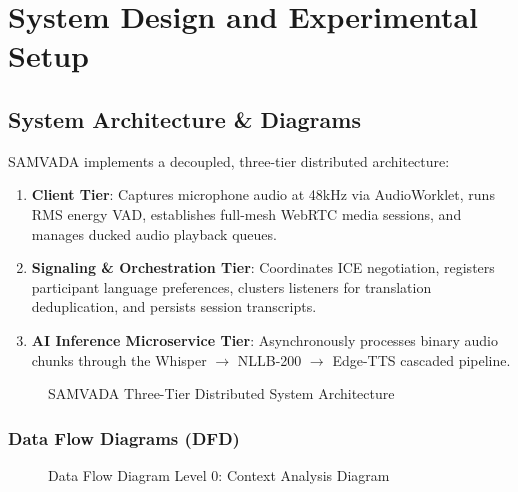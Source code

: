\documentclass[12pt,a4paper]{report}
\begin{document}
\chapter{System Design and Experimental Setup}

\section{System Architecture \& Diagrams}
SAMVADA implements a decoupled, three-tier distributed architecture:
\begin{enumerate}
    \item \textbf{Client Tier}: Captures microphone audio at 48kHz via AudioWorklet, runs RMS energy VAD, establishes full-mesh WebRTC media sessions, and manages ducked audio playback queues.
    \item \textbf{Signaling \& Orchestration Tier}: Coordinates ICE negotiation, registers participant language preferences, clusters listeners for translation deduplication, and persists session transcripts.
    \item \textbf{AI Inference Microservice Tier}: Asynchronously processes binary audio chunks through the Whisper $\rightarrow$ NLLB-200 $\rightarrow$ Edge-TTS cascaded pipeline.
\end{enumerate}

\begin{figure}[H]
  \centering
  \caption{SAMVADA Three-Tier Distributed System Architecture}
  \label{fig:fig4_1}
\end{figure}

\subsection{Data Flow Diagrams (DFD)}
\begin{figure}[H]
  \centering
  \caption{Data Flow Diagram Level 0: Context Analysis Diagram}
  \label{fig:fig4_2}
\end{figure}
\end{document}
